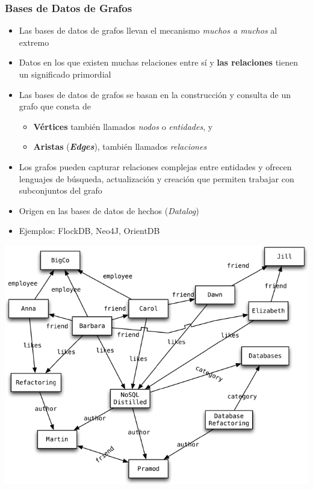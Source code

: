 \documentclass[14pt]{beamer}
\begin{document}
\begin{frame}
\begin{itemize}
\begin{frame}[allowframebreaks]
  \frametitle{Bases de Datos de Grafos}
\vspace*{-1ex}
  \begin{itemize}
  \item Las bases de datos de grafos llevan el mecanismo {\em muchos a
      muchos} al extremo
  \item Datos en los que existen muchas relaciones entre sí y {\bf las
      relaciones} tienen un significado primordial
\item Las bases de datos de grafos se basan en la construcción y consulta
  de un grafo que consta de
  \begin{itemize}
  \item {\bf Vértices} también llamados {\em nodos} o {\em entidades}, y
  \item {\bf Aristas} ({\bfseries\itshape Edges}), también llamados {\em
      relaciones}
  \end{itemize}
\item Los grafos pueden capturar relaciones complejas entre
  entidades y ofrecen lenguajes de búsqueda, actualización y creación que
  permiten trabajar con subconjuntos del grafo
\item Origen en las bases de datos de hechos ({\em Datalog\/})
\item Ejemplos: FlockDB, Neo4J, OrientDB
\end{itemize}
\end{frame}

\begin{frame}[plain]
\includegraphics[width=\textwidth]{img/graph}
\end{frame}


\end{itemize}
\end{frame}
\end{document}
